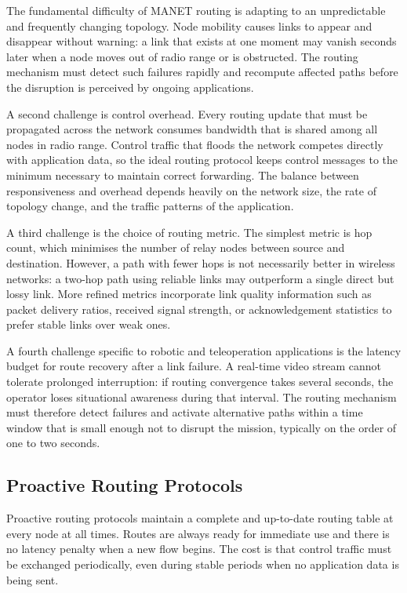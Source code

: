The fundamental difficulty of MANET routing is adapting to an unpredictable and frequently
changing topology. Node mobility causes links to appear and disappear without warning: a link
that exists at one moment may vanish seconds later when a node moves out of radio range or is
obstructed. The routing mechanism must detect such failures rapidly and recompute affected
paths before the disruption is perceived by ongoing applications.

A second challenge is control overhead. Every routing update that must be propagated across
the network consumes bandwidth that is shared among all nodes in radio range. Control traffic
that floods the network competes directly with application data, so the ideal routing protocol
keeps control messages to the minimum necessary to maintain correct forwarding. The balance
between responsiveness and overhead depends heavily on the network size, the rate of topology
change, and the traffic patterns of the application.

A third challenge is the choice of routing metric. The simplest metric is hop count, which
minimises the number of relay nodes between source and destination. However, a path with
fewer hops is not necessarily better in wireless networks: a two-hop path using reliable links
may outperform a single direct but lossy link. More refined metrics incorporate link quality
information such as packet delivery ratios, received signal strength, or acknowledgement
statistics to prefer stable links over weak ones.

A fourth challenge specific to robotic and teleoperation applications is the latency budget for
route recovery after a link failure. A real-time video stream cannot tolerate prolonged
interruption: if routing convergence takes several seconds, the operator loses situational
awareness during that interval. The routing mechanism must therefore detect failures and
activate alternative paths within a time window that is small enough not to disrupt the mission,
typically on the order of one to two seconds.

\subsection{Proactive Routing Protocols}

Proactive routing protocols maintain a complete and up-to-date routing table at every node at
all times. Routes are always ready for immediate use and there is no latency penalty when a new
flow begins. The cost is that control traffic must be exchanged periodically, even during stable
periods when no application data is being sent.

